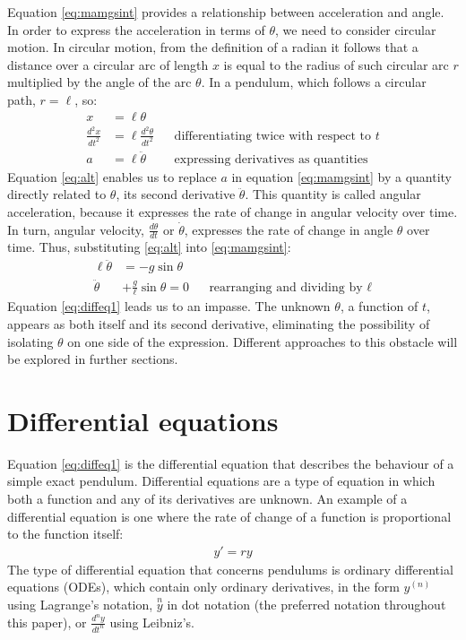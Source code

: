 \documentclass[12pt, a4paper, titlepage]{article}
\theoremstyle{definition}
\numberwithin{equation}{section}
\theoremstyle{definition}
\theoremstyle{definition}
\begin{document}
Equation \eqref{eq:mamgsint} provides a relationship between acceleration and angle. In order to express the acceleration in terms of $\theta$, we need to consider circular motion. In circular motion, from the definition of a radian it follows that a distance over a circular arc of length $x$ is equal to the radius of such circular arc $r$ multiplied by the angle of the arc $\theta$. In a pendulum, which follows a circular path, $r=\ell$, so:
\begin{align}
x&=\ell\theta\label{eq:slt}\\
\frac{d^2x}{dt^2}&=\ell\frac{d^2\theta}{dt^2}&&\text{differentiating twice with respect to $t$}\\
a&=\ell\ddot{\theta}&&\text{expressing derivatives as quantities}\label{eq:alt}
\end{align}
Equation \eqref{eq:alt} enables us to replace $a$ in equation \eqref{eq:mamgsint} by a quantity directly related to $\theta$, its second derivative $\ddot{\theta}$. This quantity is called angular acceleration, because it expresses the rate of change in angular velocity over time. In turn, angular velocity, $\frac{d\theta}{dt}$ or $\dot{\theta}$, expresses the rate of change in angle $\theta$ over time. Thus, substituting \eqref{eq:alt} into \eqref{eq:mamgsint}:
\begin{align}
\ell\ddot{\theta}&=-g\sin\theta\label{eq:ltgst}\\
\ddot{\theta}&+\frac{g}{\ell}\sin\theta=0&&\text{rearranging and dividing by $\ell$}\label{eq:diffeq1}
\end{align}
Equation \eqref{eq:diffeq1} leads us to an impasse. The unknown $\theta$, a function of $t$, appears as both itself and its second derivative, eliminating the possibility of isolating $\theta$ on one side of the expression. Different approaches to this obstacle will be explored in further sections.

\section{Differential equations}
Equation \eqref{eq:diffeq1} is the differential equation that describes the behaviour of a simple exact pendulum. Differential equations are a type of equation in which both a function and any of its derivatives are unknown. An example of a differential equation is one where the rate of change of a function is proportional to the function itself:
\begin{align}
y'=ry\label{eq:exp}
\end{align}
The type of differential equation that concerns pendulums is ordinary differential equations (ODEs), which contain only ordinary derivatives, in the form $y^{(n)}$ using Lagrange's notation, $\overset{n}{y}$ in dot notation (the preferred notation throughout this paper), or $\frac{d^ny}{dt^n}$ using Leibniz's.
\end{document}
